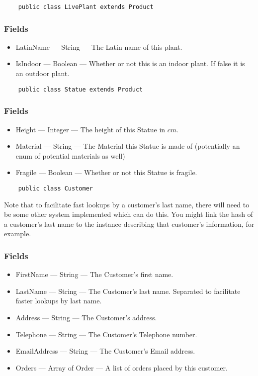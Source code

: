 \documentclass[a4paper]{report}
\begin{document}
\begin{lstlisting}
    public class LivePlant extends Product
\end{lstlisting}

\subsubsection{Fields}
\begin{itemize}
    \item LatinName --- String --- The Latin name of this plant.
    \item IsIndoor --- Boolean --- Whether or not this is an indoor plant. If false it is an outdoor plant.
\end{itemize}


\begin{lstlisting}
    public class Statue extends Product
\end{lstlisting}

\subsubsection{Fields}
\begin{itemize}
    \item Height --- Integer --- The height of this Statue in $cm$.
    \item Material --- String --- The Material this Statue is made of (potentially an enum of potential materials as well)
    \item Fragile --- Boolean --- Whether or not this Statue is fragile.
\end{itemize}


\begin{lstlisting}
    public class Customer
\end{lstlisting}

Note that to facilitate fast lookups by a customer's last name, there will need to be some other system
implemented which can do this. You might link the hash of a customer's last name to the instance describing that
customer's information, for example.

\subsubsection{Fields}
\begin{itemize}
    \item FirstName --- String --- The Customer's first name.
    \item LastName --- String --- The Customer's last name. Separated to facilitate faster lookups by last name.
    \item Address --- String --- The Customer's address.
    \item Telephone --- String --- The Customer's Telephone number.
    \item EmailAddress --- String --- The Customer's Email address.
    \item Orders --- Array of Order --- A list of orders placed by this customer.
\end{itemize}
\end{document}
